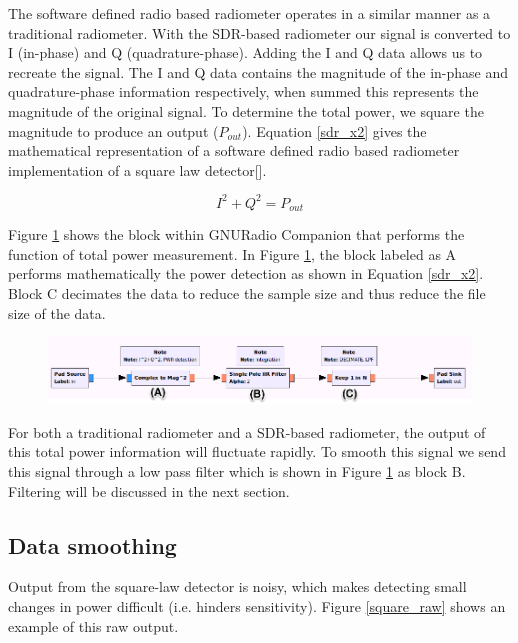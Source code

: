 The software defined radio based radiometer operates in a similar manner as a traditional radiometer.  With the SDR-based radiometer our signal is converted to I (in-phase) and Q (quadrature-phase).  Adding the I and Q data allows us to recreate the signal.  The I and Q data contains the magnitude of the in-phase and quadrature-phase information respectively, when summed this represents the magnitude of the original signal.  To determine the total power, we square the magnitude to produce an output ($P_{out}$).  Equation \ref{sdr_x2} gives the mathematical representation of a software defined radio based radiometer implementation of a square law detector[\cite{Rashid}]. 

\begin{equation}\label{sdr_x2}
I^2+Q^2 = P_{out}
\end{equation}

Figure \ref{square_block} shows the block within GNURadio Companion that performs the function of total power measurement.  In Figure \ref{square_block}, the block labeled as A performs mathematically the power detection as shown in Equation \ref{sdr_x2}.  Block C decimates the data to reduce the sample size and thus reduce the file size of the data.  

{\begin{figure}[h!tb] 
\centering
\includegraphics[width=17cm]{Images/TPR_grc.png}
\label{square_block}
\end{figure}
}

For both a traditional radiometer and a SDR-based radiometer, the output of this total power information will fluctuate rapidly.  To smooth this signal we send this signal through a low pass filter which is shown in Figure \ref{square_block} as block B.  Filtering will be discussed in the next section.

\subsection{Data smoothing}

Output from the square-law detector is noisy, which makes detecting small changes in power difficult (i.e. hinders sensitivity).  Figure \ref{square_raw} shows an example of this raw output.

